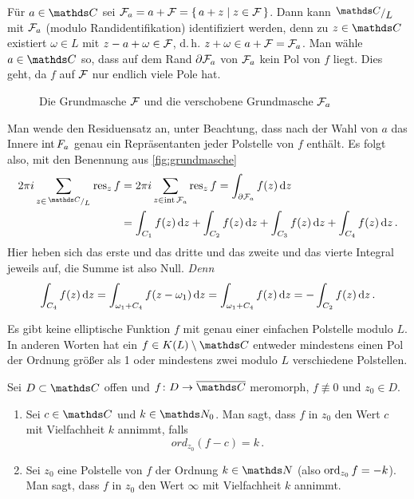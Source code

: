 \begin{bewe}
Für $a\in\CC$ sei $\mathcal{F}_a = a + \mathcal{F} = \left\{\,a + z \mid z\in\mathcal{F}\,\right\}$.
Dann kann $\modulo{\CC}{L}$ mit $\mathcal{F}_a$ (modulo Randidentifikation) identifiziert werden, denn zu $z\in\CC$ existiert $\omega \in L$ mit $z-a+\omega \in \mathcal{F}$, d.\,h. $z+\omega \in a + \mathcal{F} = \mathcal{F}_a$.
Man wähle $a\in\CC$ so, dass auf dem Rand $\partial \mathcal{F}_a$ von $\mathcal{F}_a$ kein Pol von $f$ liegt.
Dies geht, da $f$ auf $\mathcal{F}$ nur endlich viele Pole hat.

\begin{figure}
\begin{center}
	
	\caption{Die Grundmasche $\mathcal{F}$ und die verschobene Grundmasche $\mathcal{F}_a$}
	\label{fig:grundmasche}
\end{center}
\end{figure}

Man wende den Residuensatz an, unter Beachtung, dass nach der Wahl von $a$ das Innere $\operatorname{int} F_a$ genau ein Repräsentanten jeder Polstelle von $f$ enthält.
Es folgt also, mit den Benennung aus \autoref{fig:grundmasche}
\begin{align*}
	2\pi i \sum_{z\in\modulo{\CC}{L}} \res_z f
	&= 2\pi i \sum_{z\in \innere \F_a} \res_z f
	= \int_{\partial \F_a} f(z)\opd z \\
	&= \int_{C_1} f(z) \opd z + \int_{C_2} f(z) \opd z + \int_{C_3} f(z) \opd z + \int_{C_4} f(z) \opd z
	\,.
\end{align*}
Hier heben sich das erste und das dritte und das zweite und das vierte Integral jeweils auf, die Summe ist also Null.
\emph{Denn}
\[
	\int_{C_4} f(z)\,\mathrm{d} z
	= \int_{\omega_1 + C_4} f(z-\omega_1) \,\mathrm{d} z
	= \int_{\omega_1 + C_4} f(z)\,\mathrm{d} z
	= -\int_{C_2} f(z) \,\mathrm{d} z
	\,.
\]
\end{bewe}

\begin{koro}
Es gibt keine elliptische Funktion $f$ mit genau einer einfachen Polstelle modulo $L$.
In anderen Worten hat ein $f\in K(L)\setminus\CC$ entweder mindestens einen Pol der Ordnung größer als 1 oder mindestens zwei modulo $L$ verschiedene Polstellen.
\end{koro}

\begin{defi-noind}
Sei $D \subset \CC$ offen und $f\colon D \ra \closure \CC$ meromorph, $f \not\equiv 0$ und $z_0 \in D$.
\begin{enumerate}
\item Sei $c\in \CC$ und $k\in\NN_0$.
Man sagt, dass $f$ in $z_0$ den Wert $c$ mit Vielfachheit $k$ annimmt, falls
\[
	ord_{z_0} (f-c) = k
	\,.
\]

\item Sei $z_0$ eine Polstelle von $f$ der Ordnung $k\in\NN$ (also $\operatorname{ord}_{z_0} f = -k$).
Man sagt, dass $f$ in $z_0$ den Wert $\infty$ mit Vielfachheit $k$ annimmt.
\end{enumerate}
\end{defi-noind}


